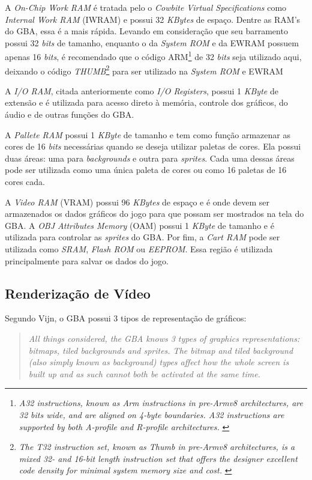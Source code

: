     A \textit{On-Chip Work RAM} é tratada pelo o \textit{Cowbite Virtual Specifications} como \textit{Internal Work RAM} (IWRAM) e possui 32 \textit{KBytes} de espaço. Dentre as RAM's do GBA, essa é a mais rápida. Levando em consideração que seu barramento possui 32 \textit{bits} de tamanho, enquanto o da \textit{System ROM} e da EWRAM possuem apenas 16 \textit{bits}, é recomendado que o código ARM\footnote{\textit{A32 instructions, known as Arm instructions in pre-Armv8 architectures, are 32 bits wide, and are aligned on 4-byte boundaries. A32 instructions are supported by both A-profile and R-profile architectures.} \cite{arm}} de 32 \textit{bits} seja utilizado aqui, deixando o código \textit{THUMB}\footnote{\textit{The T32 instruction set, known as Thumb in pre-Armv8 architectures, is a mixed 32- and 16-bit length instruction set that offers the designer excellent code density for minimal system memory size and cost.} \cite{arm}} para ser utilizado na \textit{System ROM} e EWRAM

    A \textit{I/O RAM}, citada anteriormente como \textit{I/O Registers}, possui 1 \textit{KByte} de extensão e é utilizada para acesso direto à memória, controle dos gráficos, do áudio e de outras funções do GBA.

    A \textit{Pallete RAM} possui 1 \textit{KByte} de tamanho e tem como função armazenar as cores de 16 \textit{bits} necessárias quando se deseja utilizar paletas de cores. Ela possui duas áreas: uma para \textit{backgrounds} e outra para \textit{sprites}. Cada uma dessas áreas pode ser utilizada como uma única paleta de cores ou como 16 paletas de 16 cores cada.

    A \textit{Video RAM} (VRAM) possui 96 \textit{KBytes} de espaço e é onde devem ser armazenados os dados gráficos do jogo para que possam ser mostrados na tela do GBA. A \textit{OBJ Attributes Memory} (OAM) possui 1 \textit{KByte} de tamanho e é utilizada para controlar as \textit{sprites} do GBA. Por fim, a \textit{Cart RAM} pode ser utilizada como \textit{SRAM}, \textit{Flash ROM} ou \textit{EEPROM}. Essa região é utilizada principalmente para salvar os dados do jogo.

  \subsection{Renderização de Vídeo}

    Segundo Vijn, o GBA possui 3 tipos de representação de gráficos:

    \begin{quote}
      \textit{All things considered, the GBA knows 3 types of graphics representations: bitmaps, tiled backgrounds and sprites. The bitmap and tiled background (also simply known as background) types affect how the whole screen is built up and as such cannot both be activated at the same time.} \cite[p. 38]{tonc}
    \end{quote}

